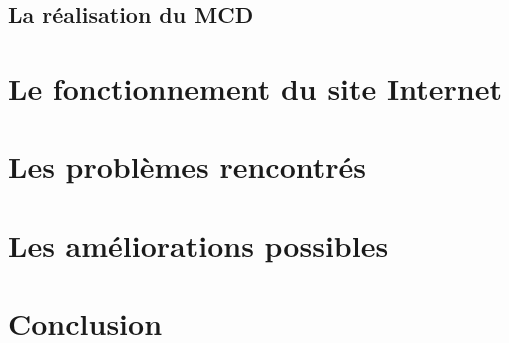\documentclass[11pt,a4paper,titlepage]{report}
\begin{document}
\section{La réalisation du MCD}

\chapter{Le fonctionnement du site Internet}

\chapter{Les problèmes rencontrés}

\chapter{Les améliorations possibles}

\chapter*{Conclusion}
\end{document}
